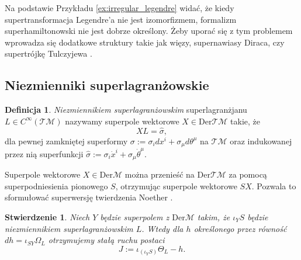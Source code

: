 \documentclass[11pt,a4paper]{report}
\newtheorem{proposition}[theorem]{Stwierdzenie}
\theoremstyle{definition}
\newtheorem{definition}[theorem]{Definicja}
\begin{document}
Na podstawie Przykładu \ref{ex:irregular_legendre} widać, że kiedy supertransformacja Legendre'a nie jest izomorfizmem, formalizm superhamiltonowski nie jest dobrze określony. Żeby uporać się z tym problemem wprowadza się dodatkowe struktury takie jak więzy, supernawiasy Diraca, czy supertrójkę Tulczyjewa \cite{cattaneo, grabowski}.
			      				
\subsection{Niezmienniki superlagranżowskie}
			      				
\begin{definition}
	\textit{Niezmiennikiem superlagranżowskim} superlagranżjanu $L\in C^\infty (\mathcal{TM})$ nazywamy superpole wektorowe $X \in \mathrm{Der} \mathcal{TM}$ takie, że
	\begin{equation*}
		XL = \widehat{\sigma},
	\end{equation*}
	dla pewnej zamkniętej superformy $\sigma := \sigma_i dx^i + \sigma_\mu d\theta^\mu$ na $\mathcal{TM}$ oraz indukowanej przez nią superfunkcji $\widehat \sigma := \sigma_i \dot x^i + \sigma_\mu \dot \theta^\mu$.
\end{definition}
			      				
Superpole wektorowe $X\in \mathrm{Der} \mathcal{M}$ można przenieść na $\mathrm{Der} \mathcal{TM}$ za pomocą superpodniesienia pionowego $S$, otrzymując superpole wektorowe $SX$. Pozwala to sformułować superwersję twierdzenia Noether \cite{carinena2}.
			      				
\begin{proposition}
	Niech $Y$ będzie superpolem z $\mathrm{Der} \mathcal{M}$ takim, że $\iota_Y S$ będzie niezmiennikiem superlagranżowskim $L$. Wtedy dla $h$ określonego przez równość $dh = \iota_{SY} \Omega_L$ otrzymujemy stałą ruchu postaci
	\begin{equation*}
		J:= \iota_{(\iota_Y S)} \Theta_L - h.
	\end{equation*}
\end{proposition}
			      				
\end{document}
